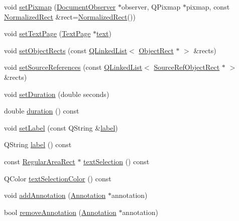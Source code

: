 \begin{DoxyCompactItemize}
\item 
void \hyperlink{classOkular_1_1Page_ae7e45a6647904b01ebe84930b73f1d79}{set\+Pixmap} (\hyperlink{classOkular_1_1DocumentObserver}{Document\+Observer} $\ast$observer, Q\+Pixmap $\ast$pixmap, const \hyperlink{classOkular_1_1NormalizedRect}{Normalized\+Rect} \&rect=\hyperlink{classOkular_1_1NormalizedRect}{Normalized\+Rect}())
\item 
void \hyperlink{classOkular_1_1Page_a2853c6369aa8ebe6b0593201ce9cf49e}{set\+Text\+Page} (\hyperlink{classOkular_1_1TextPage}{Text\+Page} $\ast$\hyperlink{classOkular_1_1Page_a11ab0f2abe5c1e760c046a33fd5393f3}{text})
\item 
void \hyperlink{classOkular_1_1Page_af8c152286039a342f0b547b5efa79b9a}{set\+Object\+Rects} (const \hyperlink{classQLinkedList}{Q\+Linked\+List}$<$ \hyperlink{classOkular_1_1ObjectRect}{Object\+Rect} $\ast$ $>$ \&rects)
\item 
void \hyperlink{classOkular_1_1Page_a27f07c4b46c4fd2ed9da0bc7786f60a5}{set\+Source\+References} (const \hyperlink{classQLinkedList}{Q\+Linked\+List}$<$ \hyperlink{classOkular_1_1SourceRefObjectRect}{Source\+Ref\+Object\+Rect} $\ast$ $>$ \&rects)
\item 
void \hyperlink{classOkular_1_1Page_aed91ead8670fb0784a95e949804945f8}{set\+Duration} (double seconds)
\item 
double \hyperlink{classOkular_1_1Page_aecb470bf27ad1040f55ae2c417063ec5}{duration} () const 
\item 
void \hyperlink{classOkular_1_1Page_ab81a90b1fb9d3b52f5df5c2b26ceca27}{set\+Label} (const Q\+String \&\hyperlink{classOkular_1_1Page_ae5cf0e5d2270c6add98bc4d9604e0e65}{label})
\item 
Q\+String \hyperlink{classOkular_1_1Page_ae5cf0e5d2270c6add98bc4d9604e0e65}{label} () const 
\item 
const \hyperlink{classOkular_1_1RegularAreaRect}{Regular\+Area\+Rect} $\ast$ \hyperlink{classOkular_1_1Page_a8b357ca7010d815f378094a7ba279a33}{text\+Selection} () const 
\item 
Q\+Color \hyperlink{classOkular_1_1Page_a976e5f9876ca12676203fce0a6323cc8}{text\+Selection\+Color} () const 
\item 
void \hyperlink{classOkular_1_1Page_a8730d8d4d0072467dc9407c7fc177b8a}{add\+Annotation} (\hyperlink{classOkular_1_1Annotation}{Annotation} $\ast$annotation)
\item 
bool \hyperlink{classOkular_1_1Page_a4f0217cfbc8986acb9bb398550cd5bc7}{remove\+Annotation} (\hyperlink{classOkular_1_1Annotation}{Annotation} $\ast$annotation)

\end{DoxyCompactItemize}
